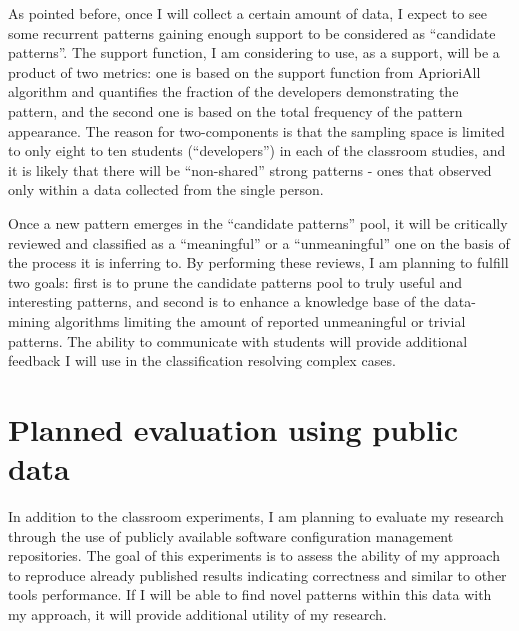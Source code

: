 As pointed before, once I will collect a certain amount of data, I expect to see some recurrent patterns gaining enough support to be considered as ``candidate patterns''. The support function, I am considering to use, as a support, will be a product of two metrics: one is based on the support function from AprioriAll algorithm and quantifies the fraction of the developers demonstrating the pattern, and the second one is based on the total frequency of the pattern appearance. The reason for two-components is that the sampling space is limited to only eight to ten students (``developers'') in each of the classroom studies, and it is likely that there will be ``non-shared'' strong patterns - ones that observed only within a data collected from the single person.

Once a new pattern emerges in the ``candidate patterns'' pool, it will be critically reviewed and classified as a ``meaningful'' or a ``unmeaningful'' one on the basis of the process it is inferring to. By performing these reviews, I am planning to fulfill two goals: first is to prune the candidate patterns pool to truly useful and interesting patterns, and second is to enhance a knowledge base of the data-mining algorithms limiting the amount of reported unmeaningful or trivial patterns. The ability to communicate with students will provide additional feedback I will use in the classification resolving complex cases.

\section{Planned evaluation using public data}\label{public.evaluation}
In addition to the classroom experiments, I am planning to evaluate my research through the use of publicly available software configuration management repositories. The goal of this experiments is to assess the ability of my approach to reproduce already published results indicating correctness and similar to other tools performance. If I will be able to find novel patterns within this data with my approach, it will provide additional utility of my research.

